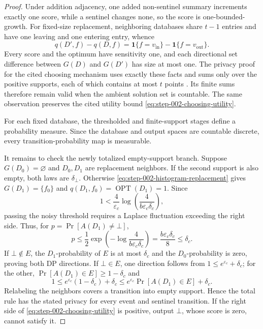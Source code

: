 \begin{proof}
Under addition adjacency, one added non-sentinel summary increments exactly
one score, while a sentinel changes none, so the score is one-bounded-growth.
For fixed-size replacement, neighboring databases share \(t-1\) entries and
have one leaving and one entering entry, whence
\begin{equation}\label{eq:step-002-histogram-replacement}
q(D',f)-q(D,f)
=\mathbf1\{f=v_{\mathrm{in}}\}-\mathbf1\{f=v_{\mathrm{out}}\}.
\end{equation}
Every score and the optimum have sensitivity one, and each directional set
difference between \(G(D)\) and \(G(D')\) has size at most one.  The privacy
proof for the cited choosing mechanism uses exactly these facts and sums
only over the positive supports, each of which contains at most \(t\) points
\citep{bunNissimStemmerVadhan2015}.  Its finite sums therefore remain valid
when the ambient solution set is countable.  The same observation preserves
the cited utility bound \eqref{eq:step-002-choosing-utility}.

For each fixed database, the thresholded and finite-support stages define a
probability measure.  Since the database and output spaces are countable
discrete, every transition-probability map is measurable.

It remains to check the newly totalized empty-support branch.  Suppose
\(G(D_0)=\varnothing\) and \(D_0,D_1\) are replacement neighbors.  If the
second support is also empty, both laws are \(\delta_\bot\).  Otherwise
\eqref{eq:step-002-histogram-replacement} gives
\(G(D_1)=\{f_0\}\) and \(q(D_1,f_0)=\operatorname{OPT}(D_1)=1\).  Since
\[
1<\frac4{\varepsilon_c}
\log\!\left(\frac4{b\varepsilon_c\delta_c}\right),
\]
passing the noisy threshold requires a Laplace fluctuation exceeding the
right side.  Thus, for \(p=\Pr[A(D_1)\ne\bot]\),
\begin{equation}\label{eq:step-002-empty-support-probability}
p\le\frac12\exp\!\left(-\log\frac4{b\varepsilon_c\delta_c}\right)
=\frac{b\varepsilon_c\delta_c}{8}\le\delta_c.
\end{equation}
If \(\bot\notin E\), the \(D_1\)-probability of \(E\) is at most
\(\delta_c\) and the \(D_0\)-probability is zero, proving both DP
directions.  If \(\bot\in E\), one direction follows from
\(1\le e^{\varepsilon_c}+\delta_c\); for the other,
\(\Pr[A(D_1)\in E]\ge1-\delta_c\) and
\begin{equation}\label{eq:step-002-empty-support-reverse}
1\le e^{\varepsilon_c}(1-\delta_c)+\delta_c
\le e^{\varepsilon_c}\Pr[A(D_1)\in E]+\delta_c.
\end{equation}
Relabeling the neighbors covers a transition into empty support.  Hence the
total rule has the stated privacy for every event and sentinel transition.
If the right side of \eqref{eq:step-002-choosing-utility} is positive,
output \(\bot\), whose score is zero, cannot satisfy it.
\end{proof}


